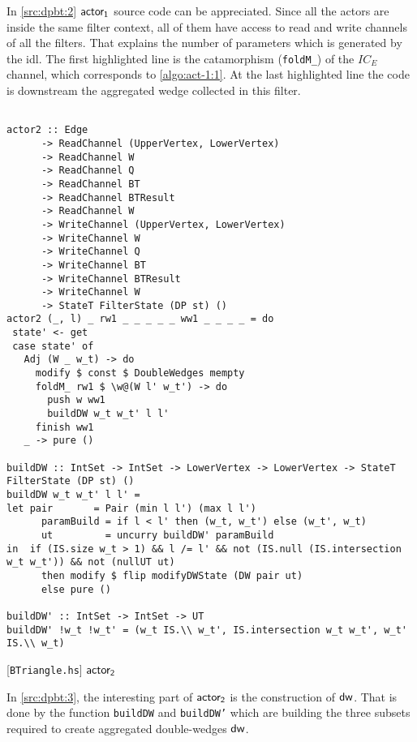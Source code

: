 In \autoref{src:dpbt:2} $\mathsf{actor_1}$ source code can be appreciated. Since all the actors are inside the same filter context, all of them have access to read and write
channels of all the filters. That explains the number of parameters which is generated by the \acrshort{idl}.
The first highlighted line is the catamorphism (\texttt{foldM_}) of the $IC_E$ channel, which corresponds to \autoref{algo:act-1:1}.
At the last highlighted line the code is downstream the aggregated wedge collected in this filter.

\begin{listing}[htp!]
\begin{verbatim}

actor2 :: Edge
      -> ReadChannel (UpperVertex, LowerVertex)
      -> ReadChannel W
      -> ReadChannel Q
      -> ReadChannel BT
      -> ReadChannel BTResult
      -> ReadChannel W
      -> WriteChannel (UpperVertex, LowerVertex)
      -> WriteChannel W
      -> WriteChannel Q
      -> WriteChannel BT
      -> WriteChannel BTResult
      -> WriteChannel W
      -> StateT FilterState (DP st) ()
actor2 (_, l) _ rw1 _ _ _ _ _ ww1 _ _ _ _ = do
 state' <- get
 case state' of
   Adj (W _ w_t) -> do
     modify $ const $ DoubleWedges mempty
     foldM_ rw1 $ \w@(W l' w_t') -> do
       push w ww1
       buildDW w_t w_t' l l'
     finish ww1
   _ -> pure ()

buildDW :: IntSet -> IntSet -> LowerVertex -> LowerVertex -> StateT FilterState (DP st) ()
buildDW w_t w_t' l l' =
let pair       = Pair (min l l') (max l l')
      paramBuild = if l < l' then (w_t, w_t') else (w_t', w_t)
      ut         = uncurry buildDW' paramBuild
in  if (IS.size w_t > 1) && l /= l' && not (IS.null (IS.intersection w_t w_t')) && not (nullUT ut)
      then modify $ flip modifyDWState (DW pair ut)
      else pure ()

buildDW' :: IntSet -> IntSet -> UT
buildDW' !w_t !w_t' = (w_t IS.\\ w_t', IS.intersection w_t w_t', w_t' IS.\\ w_t)

\end{verbatim}
\caption{[\texttt{BTriangle.hs}] $\ab$}
\label{src:dpbt:3}
\end{listing}

In \autoref{src:dpbt:3}, the interesting part of $\mathsf{actor_2}$ is the construction of $\mathsf{dw}$. That is done by the function \texttt{buildDW}
and \texttt{buildDW'} which are building the three subsets required to create aggregated double-wedges $\mathsf{dw}$.

